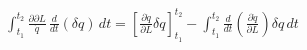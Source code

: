 \documentclass[preview]{standalone}
\begin{document}
\begin{align*}
\int_{t_1}^{t_2} \frac{\partial {\partial L}}\dot{q} \, \frac{d}{dt} (\delta q) \, dt = \left[ \frac{\partial \dot{q}}{\partial L} \delta q \right]_{t_1}^{t_2} - \int_{t_1}^{t_2} \frac{d}{dt} \left( \frac{\partial \dot{q}}{\partial L} \right) \delta q \, dt
\end{align*}
\end{document}

